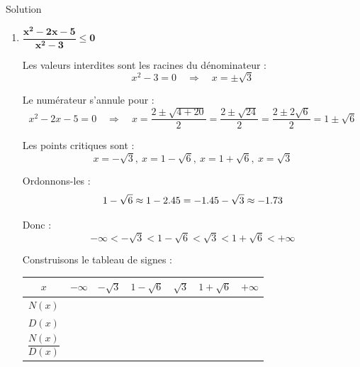 \documentclass[a4paper,12pt]{article}
\begin{document}
\begin{solutionbox}{Solution}
\begin{enumerate}
    Étudions le signe du numérateur :

    \begin{itemize}
        \item \(x < -\sqrt{2}\) : \(N(x) > 0\)
        \item \(-\sqrt{2} < x < \sqrt{2}\) : \(N(x) < 0\)
        \item \(x > \sqrt{2}\) : \(N(x) > 0\)
    \end{itemize}

    Comme \(D(x) > 0\), le signe de la fraction est le signe de \(N(x)\).

    Nous cherchons où la fraction est négative :
    \[
    -\sqrt{2} < x < \sqrt{2}
    \]
    \textbf{Solution :} \( \left]-\sqrt{2},\ \sqrt{2}\right[ \).

    \item \(\boldsymbol{\dfrac{x^2 -2x -5}{x^2 - 3} \leq 0}\)

    Les valeurs interdites sont les racines du dénominateur :
    \[
    x^2 - 3 = 0 \quad \Rightarrow \quad x = \pm \sqrt{3}
    \]

    Le numérateur s'annule pour :
    \[
    x^2 - 2x - 5 = 0 \quad \Rightarrow \quad x = \dfrac{2 \pm \sqrt{4 + 20}}{2} = \dfrac{2 \pm \sqrt{24}}{2} = \dfrac{2 \pm 2\sqrt{6}}{2} = 1 \pm \sqrt{6}
    \]

    Les points critiques sont :
    \[
    x = -\sqrt{3},\ x = 1 - \sqrt{6},\ x = 1 + \sqrt{6},\ x = \sqrt{3}
    \]
    
    Ordonnons-les :
    \[
    1 - \sqrt{6} \approx 1 - 2.45 = -1.45 \\
    -\sqrt{3} \approx -1.73 \\
    \]
    
    Donc :
    \[-\infty < -\sqrt{3} < 1 - \sqrt{6} < \sqrt{3} < 1 + \sqrt{6} < +\infty
    \]

    Construisons le tableau de signes :

    \begin{center}
    \begin{tabular}{c|cccccc}
    \(x\) & $-\infty$ & $-\sqrt{3}$ & $1 - \sqrt{6}$ & $\sqrt{3}$ & $1 + \sqrt{6}$ & $+\infty$ \\
    \hline
    \(N(x)\) & & & & & & \\
    \(D(x)\) & & & & & & \\
    \(\dfrac{N(x)}{D(x)}\) & & & & & & \\
    \end{tabular}
    \end{center}


\end{enumerate}
\end{solutionbox}
\end{document}
